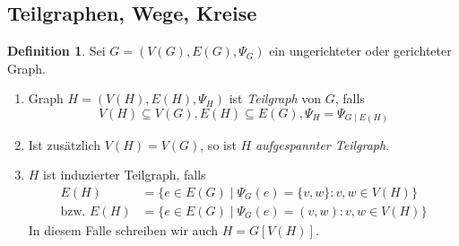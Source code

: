 \documentclass[a4paper,12pt]{article}
\theoremstyle{definition}
\newtheorem{definition}[axiom]{Definition}
\begin{document}
	\subsection{Teilgraphen, Wege, Kreise}
	\begin{definition}
		Sei $G = (V(G), E(G), \Psi_G)$ ein ungerichteter oder gerichteter Graph.
		\begin{enumerate}[label=(\alph*)]
			\item Graph $H = (V(H), E(H), \Psi_H)$ ist {\itshape Teilgraph} von $G$, falls
			\[
				V(H) \subseteq V(G), E(H) \subseteq E(G), \Psi_H = \Psi_{G \mid E(H)}
			\]
			\item Ist zusätzlich $V(H) = V(G)$, so ist $H$ {\itshape aufgespannter Teilgraph}.
			\item $H$ ist induzierter Teilgraph, falls
			\begin{align*}
				E(H) &= \{e \in E(G) \mid \Psi_G(e) = \{v, w\}: v, w \in V(H)\}\\
				\text{bzw. } E(H) &= \{e \in E(G) \mid \Psi_G(e) = (v, w): v, w \in V(H)\}
			\end{align*}
			In diesem Falle schreiben wir auch $H = G[V(H)]$.
		\end{enumerate}
	\end{definition}
\end{document}
